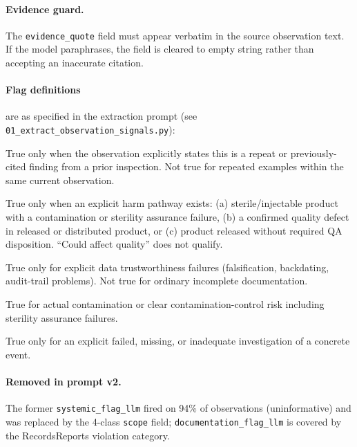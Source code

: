 \documentclass[12pt]{article}
\begin{document}
\paragraph{Evidence guard.} The \texttt{evidence\_quote} field must appear
verbatim in the source observation text. If the model paraphrases, the field
is cleared to empty string rather than accepting an inaccurate citation.

\paragraph{Flag definitions} are as specified in the extraction prompt
(see \texttt{01\_extract\_observation\_signals.py}):

\begin{description}[leftmargin=2em]
  \item[\texttt{repeat\_flag\_llm}] True only when the observation explicitly
    states this is a repeat or previously-cited finding from a prior inspection.
    Not true for repeated examples within the same current observation.
  \item[\texttt{patient\_risk\_flag\_llm}] True only when an explicit harm
    pathway exists: (a) sterile/injectable product with a contamination or
    sterility assurance failure, (b) a confirmed quality defect in released
    or distributed product, or (c) product released without required QA
    disposition. ``Could affect quality'' does not qualify.
  \item[\texttt{data\_integrity\_flag\_llm}] True only for explicit data
    trustworthiness failures (falsification, backdating, audit-trail problems).
    Not true for ordinary incomplete documentation.
  \item[\texttt{contamination\_flag\_llm}] True for actual contamination or
    clear contamination-control risk including sterility assurance failures.
  \item[\texttt{investigation\_flag\_llm}] True only for an explicit failed,
    missing, or inadequate investigation of a concrete event.
\end{description}

\paragraph{Removed in prompt v2.} The former \texttt{systemic\_flag\_llm}
fired on 94\% of observations (uninformative) and was replaced by the
4-class \texttt{scope} field; \texttt{documentation\_flag\_llm} is covered
by the RecordsReports violation category.
\end{document}
